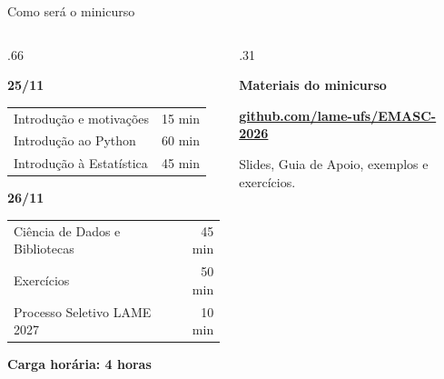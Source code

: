 \begin{frame}[t]{Como será o minicurso}
  \vspace{1mm}
  \begin{columns}[T,onlytextwidth]
    \begin{column}{.66\textwidth}
      \colorbox{emascGold}{\strut\bfseries 25/11}
      \smallskip
      \renewcommand{\arraystretch}{1.08}
      \begin{tabularx}{\linewidth}{@{}>{\raggedright\arraybackslash}Xr@{}}
        Introdução e motivações & 15 min \\
        Introdução ao Python & 60 min \\
        Introdução à Estatística & 45 min \\
      \end{tabularx}\par
      \medskip
      \colorbox{emascTurquoise}{\strut\bfseries 26/11}
      \smallskip
      \begin{tabularx}{\linewidth}{@{}>{\raggedright\arraybackslash}Xr@{}}
        Ciência de Dados e Bibliotecas & 45 min \\
        Exercícios & 50 min \\
        Processo Seletivo LAME 2027 & 10 min \\
      \end{tabularx}\par
      \medskip
      {\bfseries\color{emascPurple} Carga horária: 4 horas\par}
    \end{column}
    \begin{column}{.31\textwidth}
      \centering
      {\bfseries\color{emascPurple} Materiais do minicurso\par}
      \vspace{4mm}
      {\color{black}\par}
      \vspace{4mm}
      {\small\bfseries\href{https://github.com/lame-ufs/EMASC-2026}{\textcolor{emascPurple}{github.com/lame-ufs/\allowbreak EMASC-2026}}\par}
      \smallskip
      {\small Slides, Guia de Apoio, exemplos e exercícios.\par}
    \end{column}
  \end{columns}
\end{frame}
